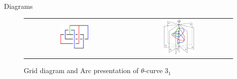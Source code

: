 \documentclass[final]{beamer}
\begin{document}
\begin{frame}[t]
\begin{columns}[t]
\begin{block}{Diagrams}
\begin{Diagrams}
      \begin{figure}[h]
        \centering
        \begin{tabular}{cc}
          \includegraphics[width=0.3\textwidth]{figure/grid.png} &
          \includegraphics[width=0.3\textwidth]{figure/openbook.png} \\
        \end{tabular}
        \caption{Grid diagram and Arc presentation of $\theta$-curve $3_1$}
      \end{figure}
    \end{Diagrams}

    

  

  
  \end{block}

  


\end{columns}
\end{frame}
\end{document}

